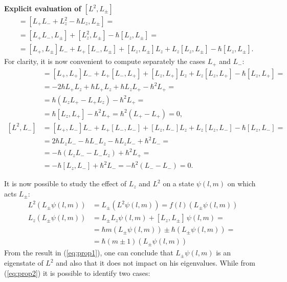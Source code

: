 \begin{tcolorbox} 
\textbf{Explicit evaluation of $[L^2,L_\pm]$} 
\begin{align*}
    [L^2,L_\pm] &= [L_+L_-+L_z^2-\hbar L_z,L_\pm] = \\
    & = [L_+L_-,L_\pm] + [L_z^2,L_\pm] - \hbar[L_z,L_\pm] = \\
    &= [L_+,L_\pm]L_- + L_+[L_-,L_\pm] + [L_z,L_\pm]L_z + L_z [L_z,L_\pm] - \hbar [L_z,L_\pm].
\end{align*}
For clarity, it is now convenient to compute separately the cases $L_+$ and $L_-$:
\begin{align*}
    [L^2,L_+] &=  [L_+,L_+]L_- + L_+[L_-,L_+] + [L_z,L_+]L_z + L_z [L_z,L_+] - \hbar [L_z,L_+] = \\
    &=  -2\hbar L_+L_z + \hbar L_+L_z + \hbar L_zL_+ - \hbar^2 L_+ = \\
    &= \hbar(L_zL_+-L_+L_z)-\hbar^2L_+ = \\
    &= \hbar[L_z,L_+] - \hbar^2 L_+ = \hbar^2 (L_+ - L_+) = 0, \\
    [L^2,L_-] &= [L_+,L_-]L_- + L_+[L_-,L_-] + [L_z,L_-]L_z + L_z [L_z,L_-] - \hbar [L_z,L_-] = \\
    & = 2\hbar L_zL_- - \hbar L_-L_z - \hbar L_zL_- + \hbar^2 L_- = \\
    & = -\hbar(L_zL_--L_-L_z)+\hbar^2L_+ = \\
    & = -\hbar[L_z,L_-] + \hbar^2 L_- = -\hbar^2 (L_- - L_-) = 0.
\end{align*}
\end{tcolorbox}
It is now possible to study the effect of $L_z$ and $L^2$ on a state $\psi(l,m)$ on which acts $L_\pm$: 
\begin{align}
    L^2 \left( L_\pm \psi (l,m) \right) &= L_\pm \left( L^2 \psi (l,m) \right) = f(l) \left( L_\pm \psi (l,m) \right) \label{eq:prop1} \\
    L_z \left( L_\pm \psi (l,m) \right) &= L_\pm L_z \psi (l,m) + [L_z, L_\pm] \, \psi (l,m) = \nonumber \\
    &= \hbar m \left( L_\pm \psi (l,m) \right) \pm \hbar \left( L_\pm \psi (l,m) \right) = \nonumber \\
    &= \hbar (m \pm 1) \left( L_\pm \psi (l,m) \right) \label{eq:prop2}
\end{align}
From the result in (\ref{eq:prop1}), one can conclude that $L_\pm \psi (l,m)$ is an eigenstate of $L^2$ and also that it does not impact on his eigenvalues. While from (\ref{eq:prop2}) it is possible to identify two cases: 
